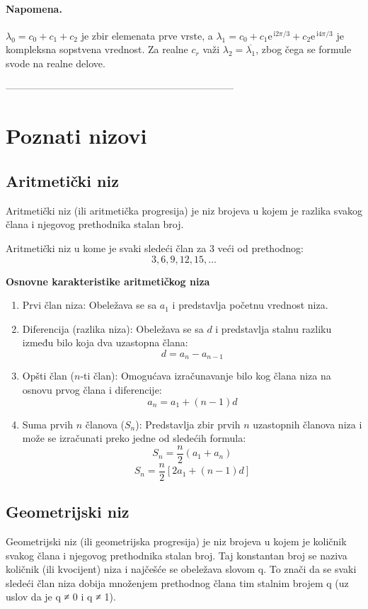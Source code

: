 \documentclass[12pt,a4paper]{report}
\newcommand{\I}{\mathrm{i}}
\newcommand{\E}{\mathrm{e}}
\begin{document}
\paragraph{Napomena.}
$\lambda_0 = c_0 + c_1 + c_2$ je zbir elemenata prve vrste, a
$\lambda_1 = c_0 + c_1 \E^{\,\I 2\pi/3} + c_2 \E^{\,\I 4\pi/3}$ je kompleksna
sopstvena vrednost. Za realne $c_r$ važi $\lambda_2 = \overline{\lambda_1}$,
zbog čega se formule svode na realne delove.

---------------------------------------------------------------------

\section{Poznati nizovi}

\subsection{Aritmetički niz}

Aritmetički niz (ili aritmetička progresija) je niz brojeva u kojem je razlika svakog člana i njegovog prethodnika stalan broj.

Aritmetički niz u kome je svaki sledeći član za $3$ veći od prethodnog:
\[3, 6, 9, 12, 15, \dots\]

\textbf{Osnovne karakteristike aritmetičkog niza}

\begin{enumerate}
	\item Prvi član niza: Obeležava se sa $a_1$ i predstavlja početnu vrednost niza.
	\item Diferencija (razlika niza): Obeležava se sa $d$ i predstavlja stalnu razliku između bilo koja dva uzastopna člana:
	\[d = a_n - a_{n-1}\]
	\item Opšti član ($n$-ti član): Omogućava izračunavanje bilo kog člana niza na osnovu prvog člana i diferencije:
	\[a_n = a_1 + (n - 1)d\]
	\item Suma prvih $n$ članova ($S_n$): Predstavlja zbir prvih $n$ uzastopnih članova niza i može se izračunati preko jedne od sledećih formula:
	\[S_n = \frac{n}{2} (a_1 + a_n)\]
	\[S_n = \frac{n}{2} [2a_1 + (n - 1)d]\]
\end{enumerate}

\subsection{Geometrijski niz}

Geometrijski niz (ili geometrijska progresija) je niz brojeva u kojem je količnik svakog člana i njegovog prethodnika stalan broj. Taj konstantan broj se naziva količnik (ili kvocijent) niza i najčešće se obeležava slovom q. To znači da se svaki sledeći član niza dobija množenjem prethodnog člana tim stalnim brojem q (uz uslov da je q ≠ 0 i q ≠ 1).
\end{document}
